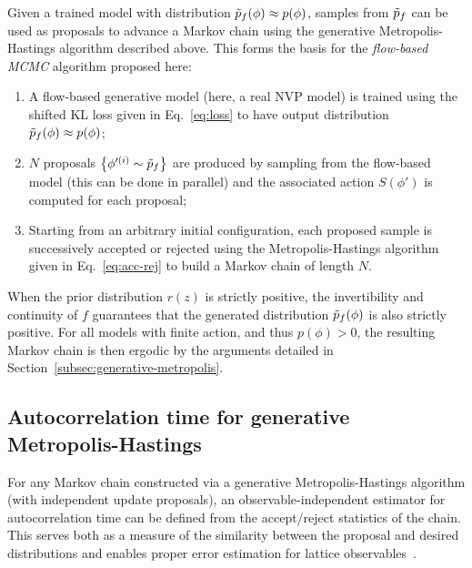 Given a trained model with distribution $\tilde{p}_f(\phi) \approx p(\phi)$, samples from $\tilde{p}_f$ can be used as proposals to advance a Markov chain using the generative Metropolis-Hastings algorithm described above. This forms the basis for the \emph{flow-based MCMC} algorithm proposed here:
\begin{enumerate}
    \item A flow-based generative model (here, a {real NVP} model) is trained using the shifted KL loss given in Eq.~\eqref{eq:loss} to have output distribution $\tilde{p}_f(\phi) \approx p(\phi)$;
    \item $N$ proposals $\left\{ \phi'^{(i)} \sim \tilde{p}_f \right\}$ are produced by sampling from the flow-based model (this can be done in parallel) and the associated action $S(\phi')$ is computed for each proposal;
    \item Starting from an arbitrary initial configuration, each proposed sample is successively accepted or rejected using the Metropolis-Hastings algorithm given in Eq.~\eqref{eq:acc-rej} to build a Markov chain of length $N$.
\end{enumerate}
%
When the prior distribution $r(z)$ is strictly positive, the invertibility and continuity of $f$ guarantees that the generated distribution $\tilde{p}_f(\phi)$ is also strictly positive. For all models with finite action, and thus $p(\phi) > 0$, the resulting Markov chain is then ergodic by the arguments detailed in Section~\ref{subsec:generative-metropolis}.


\subsection{Autocorrelation time for generative Metropolis-Hastings}
\label{subsec:autocorr}

For any Markov chain constructed via a generative Metropolis-Hastings algorithm (with independent update proposals), an observable-independent estimator for autocorrelation time can be defined from the accept/reject statistics of the chain. This serves both as a measure of the similarity between the proposal and desired distributions and enables proper error estimation for lattice observables~\cite{Wolff2003}.

